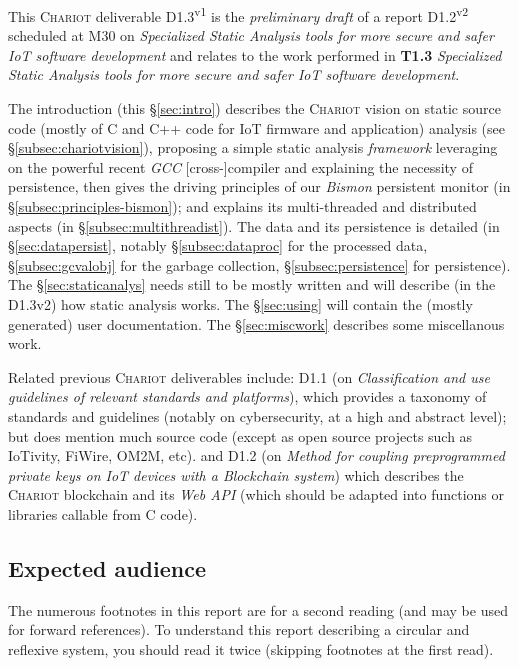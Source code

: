 This \textsc{Chariot} deliverable D1.3\textsuperscript{v1} is the
\emph{preliminary draft} of a report D1.2\textsuperscript{v2} scheduled at M30 on
\emph{Specialized Static Analysis tools for more secure and safer IoT
  software development} and relates to the work performed in
\textbf{T1.3} \emph{Specialized Static Analysis tools for more secure
  and safer IoT software development}.

The introduction (this §\ref{sec:intro}) describes the
\textsc{Chariot} vision on static source code (mostly of C and C++
code for IoT firmware and application) analysis (see
§\ref{subsec:chariotvision}), proposing a simple static analysis
\emph{framework} leveraging on the powerful recent \emph{GCC}
     [cross-]compiler and explaining the necessity of persistence,
     then gives the driving principles of our \emph{Bismon} persistent
     monitor (in §\ref{subsec:principles-bismon}); and explains its
     multi-threaded and distributed aspects (in
     §\ref{subsec:multithreadist}). The data and its persistence is
     detailed (in §\ref{sec:datapersist}, notably
     §\ref{subsec:dataproc} for the processed data,
     §\ref{subsec:gcvalobj} for the garbage collection,
     §\ref{subsec:persistence} for persistence).  The
     §\ref{sec:staticanalys} needs still to be mostly written and will
     describe (in the D1.3v2) how static analysis works. The
     §\ref{sec:using} will contain the (mostly generated) user
     documentation. The §\ref{sec:miscwork} describes some
     miscellanous work.


Related previous \textsc{Chariot} deliverables include: D1.1 (on
\emph{Classification and use guidelines of relevant standards and
  platforms}), which provides a taxonomy of standards and guidelines
(notably on cybersecurity, at a high and abstract level); but does
mention much source code (except as open source projects such as
IoTivity, FiWire, OM2M, etc). and D1.2 (on \emph{Method for coupling
  preprogrammed private keys on IoT devices with a Blockchain system})
which describes the \textsc{Chariot} blockchain and its \emph{Web API}
(which should be adapted into functions or libraries callable from C
code).

\subsection{Expected audience}
\label{subsec:audience}


The numerous footnotes in this report are for a second reading (and
may be used for forward references). To understand this report
describing a circular and reflexive system, you should read it twice
(skipping footnotes at the first read).

